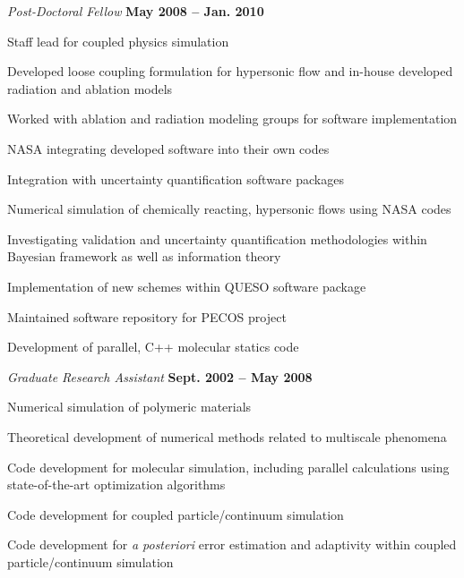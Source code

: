 \documentclass[12pt]{article}
\newenvironment{outerlist}[1][\enskip\textbullet]%
        {\begin{enumerate}[#1]}{\end{enumerate}%
         \vspace{-.6\baselineskip}}
\newenvironment{innerlist}[1][\enskip\textbullet]%
        {\begin{compactenum}[#1]}{\end{compactenum}}
\newcommand{\blankline}{\quad\pagebreak[2]}
\begin{document}
\blankline

\begin{outerlist}
\item[] \textit{Post-Doctoral Fellow}%
        \hfill \textbf{May 2008 -- Jan. 2010}
\begin{innerlist}
\item Staff lead for coupled physics simulation
	\begin{innerlist}
	\item Developed loose coupling formulation for hypersonic flow and in-house developed radiation
		and ablation models
	\item Worked with ablation and radiation modeling groups for software implementation
	\item NASA integrating developed software into their own codes
	\item Integration with uncertainty quantification software packages 
	\end{innerlist}
\item Numerical simulation of chemically reacting, hypersonic flows using NASA codes
\item Investigating validation and uncertainty quantification methodologies within Bayesian framework as 
well as information theory
\item Implementation of new schemes within QUESO software package
\item Maintained software repository for PECOS project
\item Development of parallel, C++ molecular statics code
\end{innerlist}
\end{outerlist}

\blankline

\begin{outerlist}
\item[] \textit{Graduate Research Assistant}%
        \hfill \textbf{Sept. 2002 -- May 2008}
\begin{innerlist}
\item Numerical simulation of polymeric materials
\item Theoretical development of numerical methods related to multiscale phenomena
\item Code development for molecular simulation, including parallel calculations using state-of-the-art
optimization algorithms
\item Code development for coupled particle/continuum simulation
\item Code development for \emph{a posteriori} error estimation and adaptivity within coupled
particle/continuum simulation
\end{innerlist}
\end{outerlist}
\end{document}
